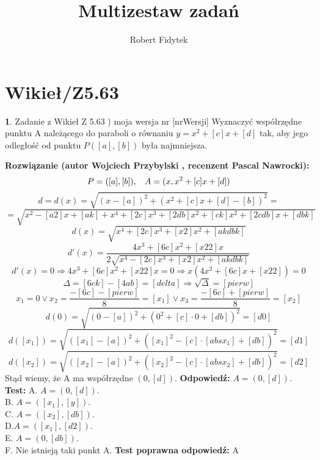 \documentclass[12pt, a4paper]{article}
\title{Multizestaw zadań}
\author{Robert Fidytek}
\date{}
\theoremstyle{definition} %
\newtheorem{zad}{}
\newcommand{\kategoria}[1]{\section{#1}} %
\newcommand{\zadStart}[1]{\begin{zad}#1\newline} %
\newcommand{\zadStop}{\end{zad}}   %
\newcommand{\rozwStart}[2]{\noindent \textbf{Rozwiązanie (autor #1 , recenzent #2): }\newline} %
\newcommand{\rozwStop}{\newline}                                            %
\newcommand{\odpStart}{\noindent \textbf{Odpowiedź:}\newline}    %
\newcommand{\odpStop}{\newline}                                             %
\newcommand{\testStart}{\noindent \textbf{Test:}\newline} %
\newcommand{\testStop}{\newline} %
\newcommand{\kluczStart}{\noindent \textbf{Test poprawna odpowiedź:}\newline} %
\newcommand{\kluczStop}{\newline} %
\begin{document}
\maketitle


\kategoria{Wikieł/Z5.63}
\zadStart{Zadanie z Wikieł Z 5.63 ) moja wersja nr [nrWersji]}
Wyznaczyć współrzędne punktu A należącego do paraboli o równaniu $y=x^{2}+[c]x+[d]$ tak, aby jego odległość od punktu $P([a],[b])$ była najmniejsza.
\zadStop
\rozwStart{Wojciech Przybylski}{Pascal Nawrocki}
$$P=([a],[b]),\hspace{3mm} A=(x, x^{2}+[c]x+[d])$$
$$d=d(x)=\sqrt{(x-[a])^{2}+(x^{2}+[c]x+[d]-[b])^{2}}=$$
$$=\sqrt{x^{2}-[a2]x+[ak]+x^{4}+[2c]x^{3}+[2db]x^{2}+[ck]x^{2}+[2cdb]x+[dbk]}$$
$$d(x)=\sqrt{x^{4}+[2c]x^{3}+[x2]x^{2}+[akdbk]}$$
$$d'(x)=\frac{4x^{3}+[6c]x^{2}+[x22]x}{2\sqrt{x^{4}-[2c]x^{3}+[x2]x^{2}+[akdbk]}}$$
$$d'(x)=0 \Rightarrow 4x^{3}+[6c]x^{2}+[x22]x=0 \Rightarrow x(4x^{2}+[6c]x+[x22])=0$$
$$\Delta=[6ck]-[4ab]=[delta] \Rightarrow \sqrt{\Delta}=[pierw]$$
$$x_{1}=0\vee x_{2}=\frac{-[6c]-[pierw]}{8}=[x_1] \vee x_{3}=\frac{-[6c]+[pierw]}{8}=[x_2]$$
$$d(0)=\sqrt{(0-[a])^{2}+(0^{2}+[c]\cdot 0+[db])^{2}}=[d0]$$
$$d([x_1])=\sqrt{([x_1]-[a])^{2}+([x_1]^{2}-[c]\cdot [absx_1]+[db])^{2}}=[d1]$$
$$d([x_2])=\sqrt{([x_2]-[a])^{2}+([x_2]^{2}-[c]\cdot [absx_2]+[db])^{2}}=[d2]$$
Stąd wiemy, że A ma współrzędne $(0,[d])$.
\rozwStop
\odpStart
$A=(0,[d])$.
\odpStop
\testStart
A. $A=(0,[d])$.\\
B. $A=([x_1],[y])$.\\
C. $A=([x_2],[db])$.\\
D.$A=([x_1],[d2])$.\\
E. $A=(0,[db])$.\\
F. Nie istnieją taki punkt A.
\testStop
\kluczStart
A
\kluczStop
\end{document}
